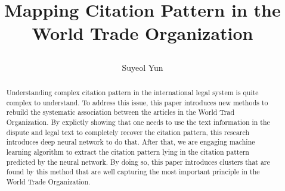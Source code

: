 \documentclass[12pt,letterpaper]{article}
\newcommand{\tit}{\bf 

Mapping Citation Pattern in the World Trade Organization
}
\newcommand\spacingset[1]{\renewcommand{\baselinestretch}
{#1}\small\normalsize}
\begin{document}
\spacingset{1.25}

\setcounter{page}{0}
\vspace{-.1in}

{\title{
    \tit
  }
  \author{Suyeol Yun
  }
  \maketitle
}

\thispagestyle{empty}
\vspace{-.1in}

\begin{abstract}

  Understanding complex citation pattern in the international legal system is quite complex to understand.
  To address this issue, this paper introduces new methods to rebuild the systematic association between the articles in the World Trad Organization. By explictly showing that one needs to use the text information in the dispute and legal text to completely recover the citation pattern, this research introduces deep neural network to do that. After that, we are engaging machine learning algorithm to extract the citation pattern lying in the citation pattern predicted by the neural network. By doing so, this paper introduces clusters that are found by this method that are well capturing the most important principle in the World Trade Organization.

\end{abstract}

\spacingset{1.5}


\end{document}
